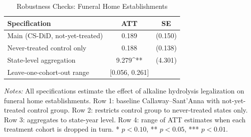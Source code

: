 \begin{table}[H]
\centering
\caption{Robustness Checks: Funeral Home Establishments}
\begin{threeparttable}
\begin{tabular}{lcc}
\toprule
Specification & ATT & SE \\
\midrule
Main (CS-DiD, not-yet-treated) & 0.189 & (0.150) \\
Never-treated control only & 0.188 & (0.138) \\
State-level aggregation & 9.279^{**} & (4.301) \\
Leave-one-cohort-out range & [0.056, 0.261] & \\
\bottomrule
\end{tabular}
\begin{tablenotes}[flushleft]
\small
\item \textit{Notes:} All specifications estimate the effect of alkaline hydrolysis legalization on funeral home establishments. Row 1: baseline Callaway--Sant'Anna with not-yet-treated control group. Row 2: restricts control group to never-treated states only. Row 3: aggregates to state-year level. Row 4: range of ATT estimates when each treatment cohort is dropped in turn. * $p<0.10$, ** $p<0.05$, *** $p<0.01$.
\end{tablenotes}
\end{threeparttable}
\label{tab:robust}
\end{table}

